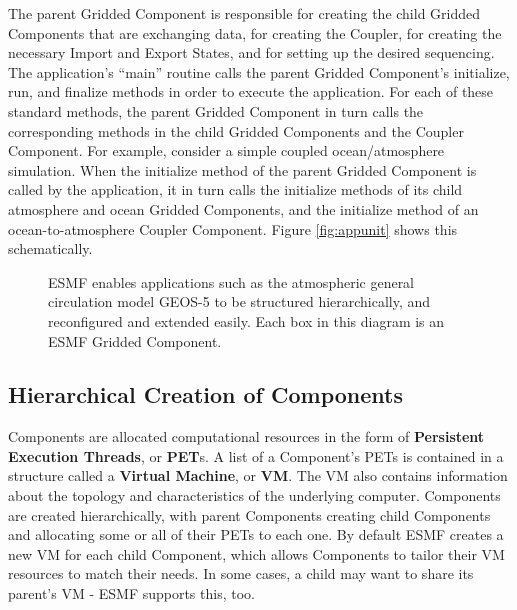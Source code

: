 The parent Gridded Component is responsible for creating the child 
Gridded Components that are exchanging data, for creating the Coupler, 
for creating the necessary Import and Export States, and for 
setting up the desired sequencing.  The application's ``main'' routine
calls the parent Gridded Component's initialize, run, and finalize 
methods in order to execute the application.  For each of these
standard methods, the parent Gridded Component in turn calls the 
corresponding methods in the child Gridded Components and the 
Coupler Component.  For example, consider a simple coupled 
ocean/atmosphere simulation.  When the initialize method of the 
parent Gridded Component is called by the application, it in turn 
calls the initialize methods of its child atmosphere and ocean 
Gridded Components, and the initialize method of an 
ocean-to-atmosphere Coupler Component.  Figure \ref{fig:appunit}
shows this schematically.

\begin{center}
\begin{figure}
\caption{ESMF enables applications such as the atmospheric general
circulation model GEOS-5 to be structured hierarchically, and 
reconfigured and extended easily.  Each box in this diagram is an
ESMF Gridded Component.}
\label{fig:GEOS5}
\end{figure}
\end{center}

\subsection{Hierarchical Creation of Components}
\label{sec:hierarchy}

Components are allocated computational resources in the form of
{\bf Persistent Execution Threads}, or {\bf PET}s.  A list of a Component's
PETs is contained in a structure called a {\bf Virtual Machine},
or {\bf VM}.  The VM also contains information about the topology and
characteristics of the underlying computer.
Components are created hierarchically, with parent Components creating
child Components and allocating some or all of their PETs to each one.
By default ESMF creates a new VM for each child Component, which 
allows Components to tailor their VM resources to match their needs.
In some cases, a child may want to share its parent's VM - ESMF
supports this, too.

